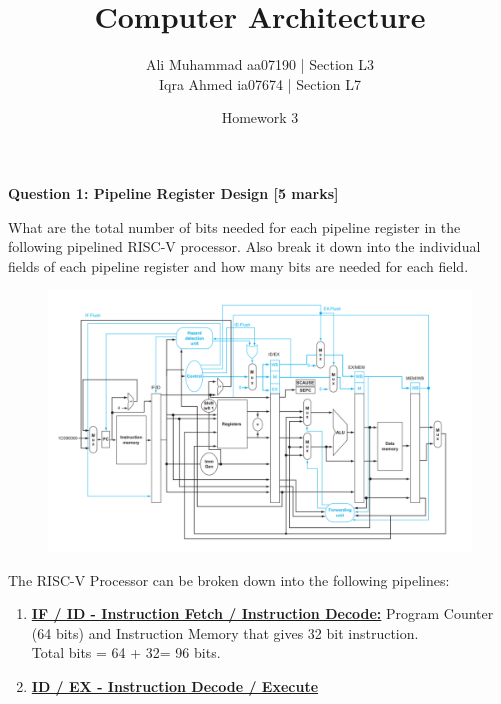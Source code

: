 \documentclass[addpoints]{exam}
\title{Computer Architecture}
\author{Ali Muhammad aa07190 | Section L3 \\ Iqra Ahmed ia07674 | Section L7}
\date{Homework 3}
\begin{document}
\maketitle

\begin{center}
    \gradetable[h][questions]
\end{center}
\begin{sloppypar}
\begin{questions}
    \question[5]
    \begin{center} \textbf{Question 1: Pipeline Register Design [5 marks]} \end{center}

    What are the total number of bits needed for each pipeline register in the following pipelined RISC-V processor. Also break it down into the individual fields of each pipeline register and how many bits are needed for each field.

    \begin{figure}[ht]
        \centering
        \includegraphics[scale = 0.5]{q1_fig.png}
    \end{figure}
    \begin{solution}
        
        The RISC-V Processor can be broken down into the following pipelines:
        \begin{enumerate}
            \item \textbf{\underline{IF / ID - Instruction Fetch / Instruction Decode:}} Program Counter (64 bits) and Instruction Memory that gives 32 bit instruction. \\ Total bits = 64 + 32= 96 bits.
            
            \item \textbf{\underline{ID / EX - Instruction Decode / Execute}} 
            

\end{enumerate}
\end{solution}
\end{questions}
\end{sloppypar}
\end{document}
